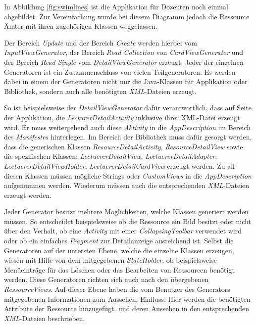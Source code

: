 In Abbildung \ref{fig:swimlines} ist die Applikation für Dozenten noch einmal abgebildet. Zur Vereinfachung wurde bei diesem Diagramm jedoch die Ressource Ämter mit ihren zugehörigen Klassen weggelassen.

Der Bereich \textit{Update} und der Bereich \textit{Create} werden hierbei vom \textit{InputViewGenerator}, der Bereich \textit{Read Collection} von \textit{CardViewGenerator} und der Bereich \textit{Read Single} vom \textit{DetailViewGenerator} erzeugt.
Jeder der einzelnen Generatoren ist ein Zusammenschluss von vielen Teilgeneratoren. Es werden dabei in einem der Generatoren nicht nur die Java-Klassen für Applikation oder Bibliothek, sondern auch alle benötigten \textit{XML}-Dateien erzeugt.

\newpage

So ist beispielsweise der \textit{DetailViewGenerator} dafür verantwortlich, dass auf Seite der Applikation, die \textit{LecturerDetailActivity} inklusive ihrer XML-Datei erzeugt wird. Er muss weitergehend auch diese \textit{Aktivity} in die \textit{AppDescription} im Bereich des \textit{Manifestes} hinterlegen. Im Bereich der Bibliothek muss dafür gesorgt werden, dass die generischen Klassen \textit{ResourceDetailActivity}, \textit{ResourceDetailView} sowie die spezifischen Klassen: \textit{LectuererDetailView}, \textit{LectuererDetailAdapter}, \textit{LectuererDetailViewHolder}, \textit{LectuererDetailCardView} erzeugt werden. Zu all diesen Klassen müssen mögliche Strings oder \textit{CustomViews} in die \textit{AppDescription} aufgenommen werden. Wiederum müssen auch die entsprechenden \textit{XML}-Dateien erzeugt werden. 

Jeder Generator besitzt mehrere Möglichkeiten, welche Klassen generiert werden müssen. So entscheidet beispielsweise ob die Ressource ein Bild besitzt oder nicht über den Verhalt, ob eine \textit{Activity} mit einer \textit{CollapsingToolbar} verwendet wird oder ob ein einfaches \textit{Fragment} zur Detailanzeige ausreichend ist.
Selbst die Generatoren auf der untersten Ebene, welche die einzelne Klassen erzeugen, wissen mit Hilfe von dem mitgegebenen \textit{StateHolder}, ob beispielsweise Menüeinträge für das Löschen oder das Bearbeiten von Ressourcen benötigt werden. Diese Generatoren richten sich auch nach den übergebenen \textit{RessourceViews}. Auf dieser Ebene haben die vom Benutzer des Generators mitgegebenen Informationen zum Aussehen, Einfluss. Hier werden die benötigten Attribute der Ressource hinzugefügt, und deren Aussehen in den entsprechenden \textit{XML}-Dateien beschrieben.


